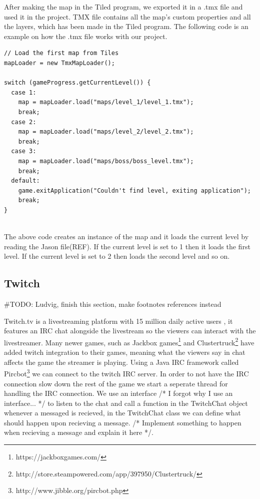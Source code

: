 \documentclass[12p]{article}
\begin{document}
After making the map in the Tiled program, we exported it in a .tmx file and used it in the project. TMX file contains all the map’s custom properties and all the layers, which has been made in the Tiled program. The following code is an example on how the .tmx file works with our project.

\begin{verbatim}
// Load the first map from Tiles
mapLoader = new TmxMapLoader();

switch (gameProgress.getCurrentLevel()) {
  case 1:
    map = mapLoader.load("maps/level_1/level_1.tmx");
    break;
  case 2:
    map = mapLoader.load("maps/level_2/level_2.tmx");
    break;
  case 3:
    map = mapLoader.load("maps/boss/boss_level.tmx");
    break;
  default:
    game.exitApplication("Couldn't find level, exiting application");
    break;
}


\end{verbatim}

The above code creates an instance of the map and it loads the current level by reading the Jason file(REF). If the current level is set to 1 then it loads the first level. If the current level is set to 2 then loads the second level and so on.



\subsection{Twitch} \label{Twitch}

\#TODO: Ludvig, finish this section, make footnotes references instead

Twitch.tv is a livestreaming platform with 15 million daily active users \cite{twitchAbout}, it features an IRC chat alongside the livestream so the viewers can interact with the livestreamer. Many newer games, such as Jackbox games\footnote{https://jackboxgames.com/} and Clustertruck\footnote{http://store.steampowered.com/app/397950/Clustertruck/} have added twitch integration to their games, meaning what the viewers say in chat affects the game the streamer is playing. Using a Java IRC framework called Pircbot\footnote{http://www.jibble.org/pircbot.php} we can connect to the twitch IRC server. In order to not have the IRC connection slow down the rest of the game we start a seperate thread for handling the IRC connection. We use an interface /* I forgot why I use an interface... */ to listen to the chat and call a function in the TwitchChat object whenever a messaged is recieved, in the TwitchChat class we can define what should happen upon recieving a message. /* Implement something to happen when recieving a message and explain it here */.
\end{document}
